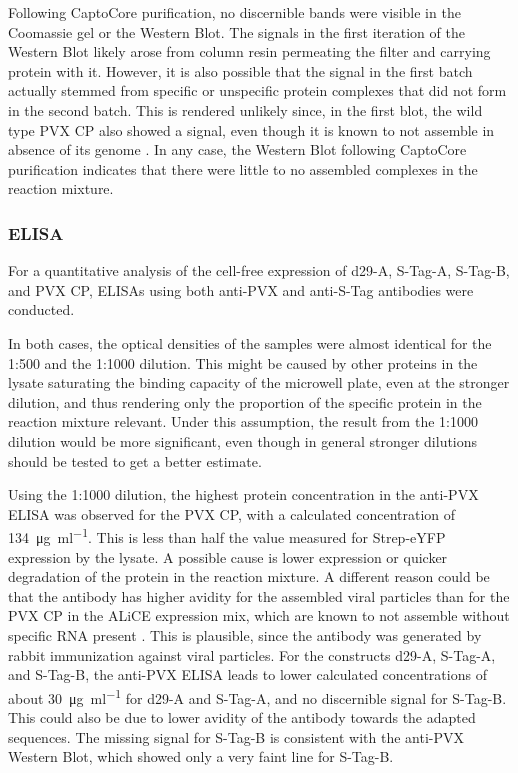 Following CaptoCore purification, no discernible bands were visible in the Coomassie gel or the Western Blot. The signals in the first iteration of the Western Blot likely arose from column resin permeating the filter and carrying protein with it. However, it is also possible that the signal in the first batch actually stemmed from specific or unspecific protein complexes that did not form in the second batch. This is rendered unlikely since, in the first blot, the wild type PVX CP also showed a signal, even though it is known to not assemble in absence of its genome \cite{juli_sagt_keine_assembly}. In any case, the Western Blot following CaptoCore purification indicates that there were little to no assembled complexes in the reaction mixture. 

\subsubsection{ELISA}
For a quantitative analysis of the cell-free expression of d29-A, S-Tag-A, S-Tag-B, and PVX CP, ELISAs using both anti-PVX and anti-S-Tag antibodies were conducted. 

In both cases, the optical densities of the samples were almost identical for the 1:500 and the 1:1000 dilution. This might be caused by other proteins in the lysate saturating the binding capacity of the microwell plate, even at the stronger dilution, and thus rendering only the proportion of the specific protein in the reaction mixture relevant. Under this assumption, the result from the 1:1000 dilution would be more significant, even though in general stronger dilutions should be tested to get a better estimate. 

Using the 1:1000 dilution, the highest protein concentration in the anti-PVX ELISA was observed for the PVX CP, with a calculated concentration of \SI{134}{\micro\gram\per\milli\litre}. This is less than half the value measured for Strep-eYFP expression by the lysate. A possible cause is lower expression or quicker degradation of the protein in the reaction mixture. A different reason could be that the antibody has higher avidity for the assembled viral particles than for the PVX CP in the ALiCE expression mix, which are known to not assemble without specific RNA present \cite{pvx_assembly}. This is plausible, since the antibody was generated by rabbit immunization against viral particles. For the constructs d29-A, S-Tag-A, and S-Tag-B, the anti-PVX ELISA leads to lower calculated concentrations of about \SI{30}{\micro\gram\per\milli\litre} for d29-A and S-Tag-A, and no discernible signal for S-Tag-B. This could also be due to lower avidity of the antibody towards the adapted sequences. The missing signal for S-Tag-B is consistent with the anti-PVX Western Blot, which showed only a very faint line for S-Tag-B. 

